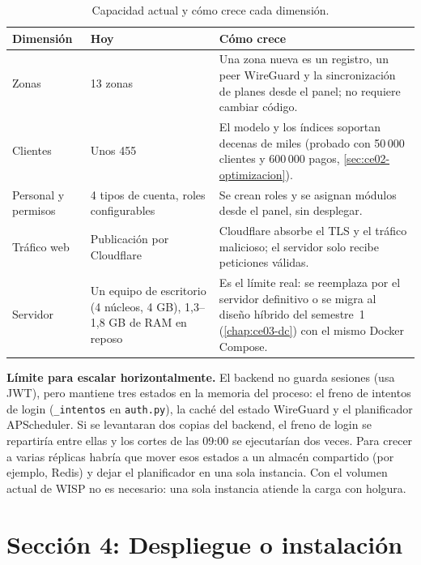 \begin{table}[H]
\centering
\caption{Capacidad actual y cómo crece cada dimensión.}
\label{tab:ce02-e3-escala}
\small
\begin{tabularx}{\textwidth}{L{2.8cm}L{4cm}X}
\toprule
\textbf{Dimensión} & \textbf{Hoy} & \textbf{Cómo crece} \\
\midrule
Zonas & 13 zonas & Una zona nueva es un registro, un peer WireGuard y la sincronización de planes desde el panel; no requiere cambiar código. \\
Clientes & Unos 455 & El modelo y los índices soportan decenas de miles (probado con 50\,000 clientes y 600\,000 pagos, \cref{sec:ce02-optimizacion}). \\
Personal y permisos & 4 tipos de cuenta, roles configurables & Se crean roles y se asignan módulos desde el panel, sin desplegar. \\
Tráfico web & Publicación por Cloudflare & Cloudflare absorbe el TLS y el tráfico malicioso; el servidor solo recibe peticiones válidas. \\
Servidor & Un equipo de escritorio (4 núcleos, 4 GB), 1,3--1,8 GB de RAM en reposo & Es el límite real: se reemplaza por el servidor definitivo o se migra al diseño híbrido del semestre~1 (\cref{chap:ce03-dc}) con el mismo Docker Compose. \\
\bottomrule
\end{tabularx}
\end{table}

\noindent \textbf{Límite para escalar horizontalmente.} El backend no guarda sesiones (usa
JWT), pero mantiene tres estados en la memoria del proceso: el freno de intentos de login
(\texttt{\_intentos} en \texttt{auth.py}), la caché del estado WireGuard y el planificador
APScheduler. Si se levantaran dos copias del backend, el freno de login se repartiría entre
ellas y los cortes de las 09:00 se ejecutarían dos veces. Para crecer a varias réplicas habría
que mover esos estados a un almacén compartido (por ejemplo, Redis) y dejar el planificador
en una sola instancia. Con el volumen actual de WISP no es necesario: una sola instancia
atiende la carga con holgura.

\section{Sección 4: Despliegue o instalación}
\label{sec:ce02-e3-despliegue}


